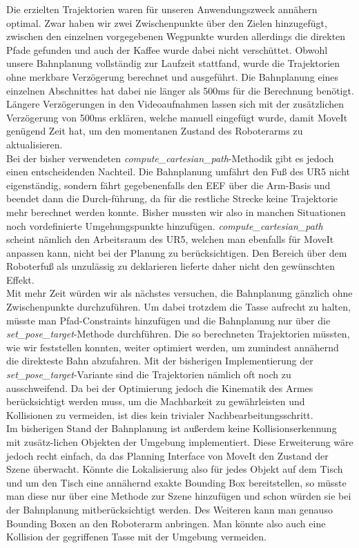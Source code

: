 Die erzielten Trajektorien waren für unseren Anwendungszweck annähern optimal. Zwar haben wir zwei Zwischenpunkte über den Zielen hinzugefügt, zwischen den einzelnen vorgegebenen Wegpunkte wurden allerdings die direkten Pfade gefunden und auch der Kaffee wurde dabei nicht verschüttet.
\newline
Obwohl unsere Bahnplanung vollständig zur Laufzeit stattfand, wurde die Trajektorien ohne merkbare Verzögerung berechnet und ausgeführt. Die Bahnplanung eines einzelnen Abschnittes hat dabei nie länger als 500ms für die Berechnung benötigt. Längere Verzögerungen in den Videoaufnahmen lassen sich mit der zusätzlichen Verzögerung von 500ms erklären, welche manuell eingefügt wurde, damit MoveIt genügend Zeit hat, um den momentanen Zustand des Roboterarms zu aktualisieren.
\newline \\
Bei der bisher verwendeten \textit{compute\_cartesian\_path}-Methodik gibt es jedoch einen entscheidenden Nachteil. Die Bahnplanung umfährt den Fuß des UR5 nicht eigenständig, sondern fährt gegebenenfalls den EEF über die Arm-Basis und beendet dann die Durch-führung, da für die restliche Strecke keine Trajektorie mehr berechnet werden konnte. Bisher mussten wir also in manchen Situationen noch vordefinierte Umgehungspunkte hinzufügen. \textit{compute\_cartesian\_path} scheint nämlich den Arbeitsraum des UR5, welchen man ebenfalls für MoveIt anpassen kann, nicht bei der Planung zu berücksichtigen. Den Bereich über dem Roboterfuß als unzulässig zu deklarieren lieferte daher nicht den gewünschten Effekt.
\newline \\
Mit mehr Zeit würden wir als nächstes versuchen, die Bahnplanung gänzlich ohne Zwischenpunkte durchzuführen. Um dabei trotzdem die Tasse aufrecht zu halten, müsste man Pfad-Constraints hinzufügen und die Bahnplanung nur über die \textit{set\_pose\_target}-Methode durchführen.
\newline
Die so berechneten Trajektorien müssten, wie wir feststellen konnten, weiter optimiert werden, um zumindest annähernd die direkteste Bahn abzufahren. Mit der bisherigen Implementierung der \textit{set\_pose\_target}-Variante sind die Trajektorien nämlich oft noch zu ausschweifend. Da bei der Optimierung jedoch die Kinematik des Armes berücksichtigt werden muss, um die Machbarkeit zu gewährleisten und Kollisionen zu vermeiden, ist dies kein trivialer Nachbearbeitungsschritt.
\newline \\
Im bisherigen Stand der Bahnplanung ist außerdem keine Kollisionserkennung mit zusätz-lichen Objekten der Umgebung implementiert. Diese Erweiterung wäre jedoch recht einfach, da das Planning Interface von MoveIt den Zustand der Szene überwacht. Könnte die Lokalisierung also für jedes Objekt auf dem Tisch und um den Tisch eine annähernd exakte Bounding Box bereitstellen, so müsste man diese nur über eine Methode zur Szene hinzufügen und schon würden sie bei der Bahnplanung mitberücksichtigt werden. Des Weiteren kann man genauso Bounding Boxen an den Roboterarm anbringen. Man könnte also auch eine Kollision der gegriffenen Tasse mit der Umgebung vermeiden.